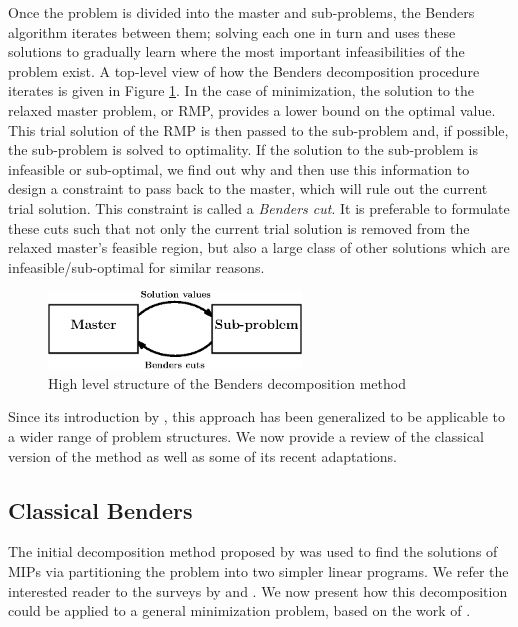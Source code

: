 
Once the problem is divided into the master and sub-problems, the 
Benders algorithm iterates between them; solving each one in turn and uses
these solutions to gradually learn where the most
important infeasibilities of the problem exist.
A top-level view of how the Benders decomposition procedure
iterates is given in Figure \ref{fig:lit:topLevelBenders}.
In the case of minimization, the solution to the relaxed master 
problem, or RMP, provides a lower bound on the optimal value.
This trial solution of the RMP is then passed to the sub-problem
and, if possible, the sub-problem is solved to optimality.
If the solution to the sub-problem is infeasible or sub-optimal,
we find out why and then use this information to design
a constraint to pass back to the master, which will rule out
the current trial solution.
This constraint is called a \emph{Benders cut}.
It is preferable
to formulate these cuts such that not only the current trial solution
is removed from the relaxed master's feasible region, but also
a large class of other solutions which are infeasible/sub-optimal for
similar reasons.

\begin{figure}[tbp]
	\centering
	\caption{High level structure of the Benders decomposition method}
	\vspace{2mm}
	\label{fig:lit:topLevelBenders}
	\includegraphics[width=0.6\textwidth]{images/bendersAbstract.eps}
\end{figure}

Since its introduction by \citeauthor{Benders1962},
this approach has been generalized to be applicable to a wider range of problem
structures. We now provide a review of the classical version of the method
as well as some of its recent adaptations.

\subsection{Classical Benders}
\label{sec:lit:clasBend}
The initial decomposition method proposed by \citeauthor{Benders1962}
was used to find the solutions of MIPs via partitioning
the problem into two simpler linear programs.
We refer the interested reader to the surveys by
 and .
We now present how this decomposition could be applied
to a general minimization problem, based on the work
of .

